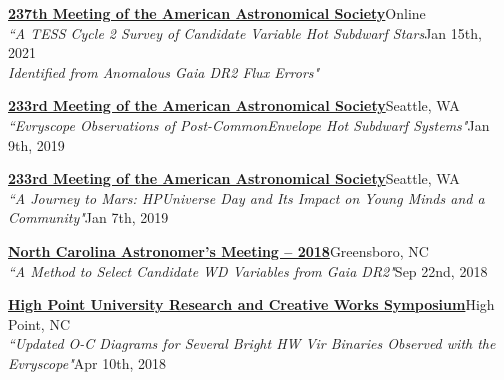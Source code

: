 \documentclass[letterpaper,12pt]{article}
\begin{document}
\begin{etaremune}
    \item \href{https://aas.org/meetings/aas237}{{\small\textbf{237th Meeting of the American Astronomical Society}}}\hfill{\small Online}\\
    {\scriptsize \textit{``A TESS Cycle 2 Survey of Candidate Variable Hot Subdwarf Stars}\hfill\footnotesize Jan 15th, 2021\vspace{-1.5mm}\\
    \scriptsize\textit{Identified from Anomalous Gaia DR2 Flux Errors"}} \vspace{-1mm}
    \item \href{https://aas.org/meetings/aas233}{{\small\textbf{233rd Meeting of the American Astronomical Society}}}\hfill{\small Seattle, WA}\\
    {\scriptsize \textit{``Evryscope Observations of Post-CommonEnvelope Hot Subdwarf Systems"}\hfill \footnotesize Jan 9th, 2019}\vspace{-1mm}
    \item \href{https://aas.org/meetings/aas233}{{\small\textbf{233rd Meeting of the American Astronomical Society}}}\hfill{\small Seattle, WA}\\
    {\scriptsize \textit{``A Journey to Mars: HPUniverse Day and Its Impact on Young Minds and a Community"}\hfill \footnotesize Jan 7th, 2019}\vspace{-1mm}
    \item \href{https://www.gtcc.edu/community-engagement/cline-observatory/special-lectures-and-events/ncam.php}{\small\textbf{North Carolina Astronomer's Meeting -- 2018}}\hfill {Greensboro, NC}\\
    {\scriptsize \textit{``A Method to Select Candidate WD Variables from \textit{Gaia} DR2"}\hfill \footnotesize Sep 22nd, 2018}\vspace{-1mm}
    \item \href{http://www.highpoint.edu/highpurcs/}{\footnotesize\textbf{High Point University Research and Creative Works Symposium}}\hfill {High Point, NC}\\
    {\scriptsize \textit{``Updated O-C Diagrams for Several Bright HW Vir Binaries Observed with the Evryscope"}\hfill \footnotesize Apr 10th, 2018}\vspace{-1mm}

\end{etaremune}
\end{document}
